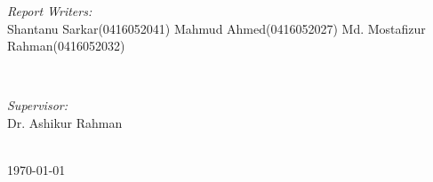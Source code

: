 \begin{titlepage}
\begin{minipage}{0.5\textwidth}
\begin{flushleft} \large
\emph{Report Writers:}\\
Shantanu Sarkar\newline(0416052041) \newline %
Mahmud Ahmed\newline(0416052027) \newline
Md. Mostafizur Rahman\newline(0416052032) 
\end{flushleft}
\end{minipage}
~
\begin{minipage}{0.4\textwidth}
\begin{flushright} \large
\emph{Supervisor:} \\
Dr. Ashikur  Rahman%
\end{flushright}
\end{minipage}\\[1cm]





{\large \today}\\[.5cm] %



 

\vfill %

\end{titlepage}

\tableofcontents

\newpage
\begin{abstract}

\end{abstract}

